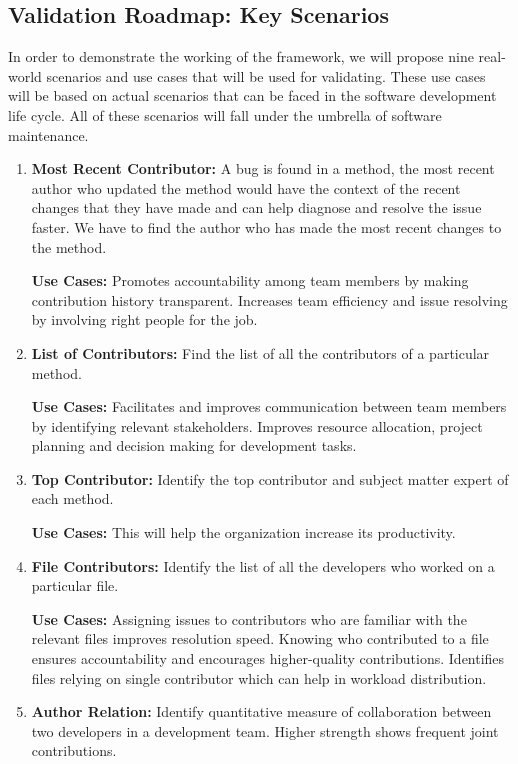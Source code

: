 \subsection{Validation Roadmap: Key Scenarios}\label{ch3:validation_roadmap}

In order to demonstrate the working of the framework, we will propose nine real-world scenarios and use cases that will be used for validating. These use cases will be based on actual scenarios that can be faced in the software development life cycle. All of these scenarios will fall under the umbrella of software maintenance.

\begin{enumerate}[before={\vspace{10pt}}, after={\vspace{10pt}}, itemsep=10pt, nosep, leftmargin=\parindent, labelindent=0pt]
    \item \textbf{Most Recent Contributor:} A bug is found in a method, the most recent author who updated the method would have the context of the recent changes that they have made and can help diagnose and resolve the issue faster. We have to find the author who has made the most recent changes to the method.

    \textbf{Use Cases:} Promotes accountability among team members by making contribution history transparent. Increases team efficiency and issue resolving by involving right people for the job.
    \vspace{10pt}
    \item \textbf{List of Contributors:} Find the list of all the contributors of a particular method.
    
    \textbf{Use Cases:} Facilitates and improves communication between team members by identifying relevant stakeholders. Improves resource allocation, project planning and decision making for development tasks.
    \vspace{10pt}
    \item \textbf{Top Contributor:} Identify the top contributor and subject matter expert of each method.
    
    \textbf{Use Cases:} This will help the organization increase its productivity.
    \vspace{10pt}
    \item \textbf{File Contributors:} Identify the list of all the developers who worked on a particular file.
    
    \textbf{Use Cases:} Assigning issues to contributors who are familiar with the relevant files improves resolution speed. Knowing who contributed to a file ensures accountability and encourages higher-quality contributions. Identifies files relying on single contributor which can help in workload distribution.
    \vspace{10pt}
    \item \textbf{Author Relation:} Identify quantitative measure of collaboration between two developers in a development team. Higher strength shows frequent joint contributions.
    

\end{enumerate}
